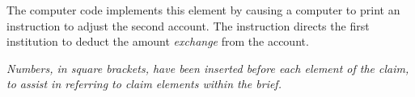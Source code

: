\documentclass{scotus}
\begin{document}
The computer code implements this element by causing a computer to print an
instruction to adjust the second account. The instruction directs the
first institution to deduct the amount \emph{exchange} from the account.


\emph{Numbers, in square brackets, have been inserted before each element of the
claim, to assist in referring to claim elements within the brief.}

\wholeclaim
\end{document}
